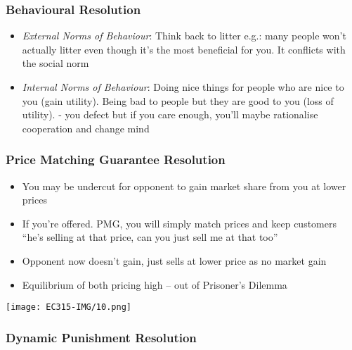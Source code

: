 \documentclass[11pt, english]{article}
\begin{document}
		\subsubsection{Behavioural Resolution}
	
	\begin{itemize}
        \setlength\itemsep{0cm}
		\item \textit{External Norms of Behaviour}: Think back to litter e.g.: many people won't actually litter even though it's the most beneficial for you. It conflicts with the social norm
		\item \textit{Internal Norms of Behaviour}: Doing nice things for people who are nice to you (gain utility). Being bad to people but they are good to you (loss of utility). - you defect but if you care enough, you'll maybe rationalise cooperation and change mind
	\end{itemize}

		\subsubsection{Price Matching Guarantee Resolution}

	\begin{itemize}                                         
        \setlength\itemsep{0cm}
		\item You may be undercut for opponent to gain market share from you at lower prices
		\item If you're offered. PMG, you will simply match prices and keep customers ``he's selling at that price, can you just sell me at that too''
		\item Opponent now doesn't gain, just sells at lower price as no market gain
		\item Equilibrium of both pricing high – out of Prisoner's Dilemma
	\end{itemize}

	\begin{center}
		\texttt{[image: EC315-IMG/10.png]}
	\end{center}

		\subsubsection{Dynamic Punishment Resolution}
\end{document}
